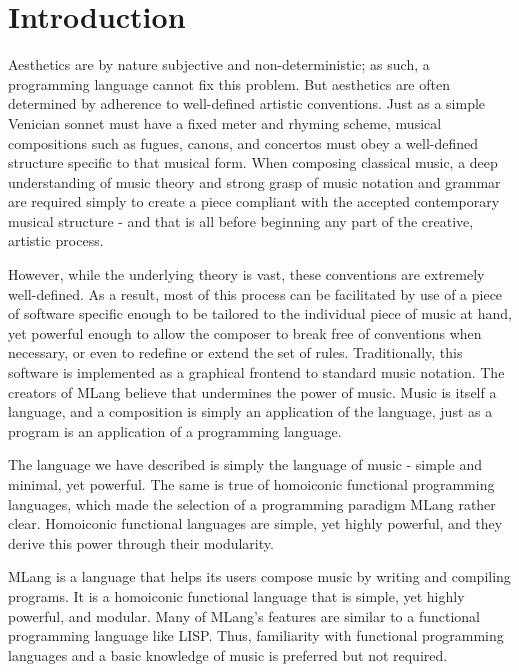 \documentclass[letterpaper,11pt]{article}
\begin{document}

\section{Introduction}

Aesthetics are by nature subjective and non-deterministic; as such, a programming language cannot fix this problem. But aesthetics are often determined by adherence to well-defined artistic conventions. Just as a simple Venician sonnet must have a fixed meter and rhyming scheme, musical compositions such as fugues, canons, and concertos must obey a well-defined structure specific to that musical form. When composing classical music, a deep understanding of music theory and strong grasp of music notation and grammar are required simply to create a piece compliant with the accepted contemporary musical structure - and that is all before beginning any part of the creative, artistic process. 

However, while the underlying theory is vast, these conventions are extremely well-defined. As a result, most of this process can be facilitated by use of a piece of software specific enough to be tailored to the individual piece of music at hand, yet powerful enough to allow the composer to break free of conventions when necessary, or even to redefine or extend the set of rules. Traditionally, this software is implemented as a graphical frontend to standard music notation. The creators of MLang believe that undermines the power of music. Music is itself a language, and a composition is simply an application of the language, just as a program is an application of a programming language.

The language we have described is simply the language of music - simple and minimal, yet powerful. The same is true of homoiconic functional programming languages, which made the selection of a programming paradigm MLang rather clear. Homoiconic functional languages are simple, yet highly powerful, and they derive this power through their modularity.

MLang is a language that helps its users compose music by writing and compiling programs. It is a homoiconic functional language that is simple,
yet highly powerful, and modular. Many of MLang's features are similar to a functional programming language like LISP. 
Thus, familiarity with functional programming languages and a basic knowledge of music is preferred but not required.
\end{document}
